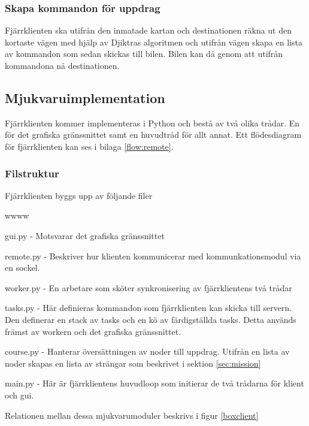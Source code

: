 \documentclass[tekniskrapport/tech.tex]{subfiles}
\begin{document}
\subsubsection{Skapa kommandon för uppdrag}
Fjärrklienten ska utifrån den inmatade kartan och destinationen räkna ut den
kortaste vägen med hjälp av Djiktras algoritmen och utifrån vägen skapa en
lista av kommandon som sedan skickas till bilen. Bilen kan då genom att utifrån
kommandona nå destinationen.

\subsection{Mjukvaruimplementation}
Fjärrklienten kommer implementeras i Python och bestå av två olika trådar. En
för det grafiska gränssnittet samt en huvudtråd för allt annat. Ett
flödesdiagram för fjärrklienten kan ses i bilaga \ref{flow:remote}.

\subsubsection{Filstruktur}
Fjärrklienten byggs upp av följande filer

\begin{labeling}{wwww}
	\item[gui.py] - Motsvarar det grafiska gränssnittet
	
	\item[remote.py] - Beskriver hur klienten kommunicerar med
		kommunkationsmodul via en sockel.

	\item[worker.py] - En arbetare som sköter synkronisering av
		fjärrklientens två trådar
	
	\item[tasks.py] - Här definieras kommandon som fjärrklienten kan skicka
		till servern. Den definerar en stack av tasks och en kö av
		färdigställda tasks.  Detta används främst av workern och
		det grafiska gränssnittet.
    
    \item[course.py] - Hanterar översättningen av noder till uppdrag. Utifrån
    en lista av noder skapas en lista av strängar som beskrivet i sektion
    \ref{sec:mission}

    \item[main.py] - Här är fjärrklientens huvudloop som initierar de två
    trådarna för klient och gui.

\end{labeling}
Relationen mellan dessa mjukvarumoduler beskrivs i figur \ref{boxclient}
\end{document}
